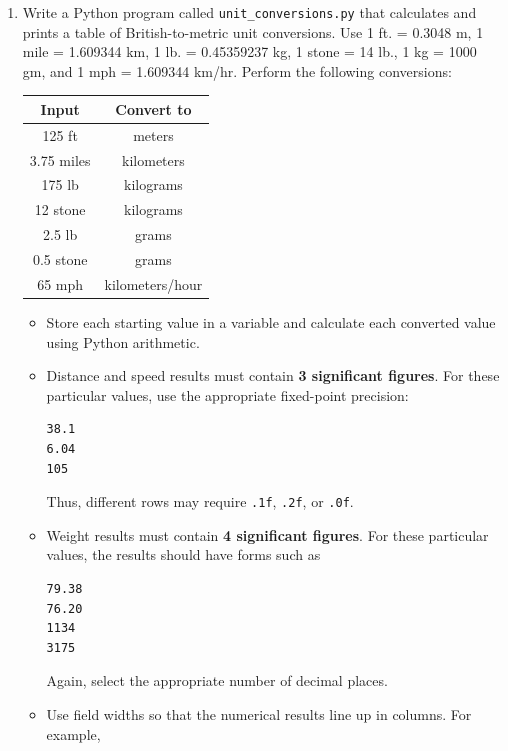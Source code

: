 \documentclass{article}
\begin{document}
\begin{enumerate}

\item Write a Python program called
\texttt{unit\_conversions.py} that calculates and prints a table of British-to-metric unit conversions. Use 1 ft. = 0.3048 m, 1 mile = 1.609344 km, 1 lb. = 0.45359237 kg, 1 stone = 14 lb., 1 kg = 1000 gm, and 1 mph = 1.609344 km/hr.  Perform the following conversions:

\begin{center}
\begin{tabular}{c|c}
\textbf{Input} & \textbf{Convert to} \\ \hline
125 ft & meters \\
3.75 miles & kilometers \\
175 lb & kilograms \\
12 stone & kilograms \\
2.5 lb & grams \\
0.5 stone & grams \\
65 mph & kilometers/hour
\end{tabular}
\end{center}

\begin{itemize}

\item Store each starting value in a variable and calculate each
converted value using Python arithmetic.

\item Distance and speed results must contain \textbf{3 significant
figures}.  For these particular values, use the appropriate
fixed-point precision:
\begin{verbatim}
38.1
6.04
105
\end{verbatim}

Thus, different rows may require \texttt{.1f}, \texttt{.2f},
or \texttt{.0f}.

\item Weight results must contain \textbf{4 significant figures}.
For these particular values, the results should have forms such as

\begin{verbatim}
79.38
76.20
1134
3175
\end{verbatim}

Again, select the appropriate number of decimal places.

\item Use field widths so that the numerical results line up in
columns.  For example,


\end{itemize}
\end{enumerate}
\end{document}
